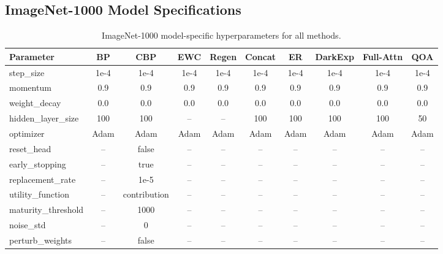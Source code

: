 \documentclass{article}
\begin{document}






\subsection{ImageNet-1000 Model Specifications}
\label{sec:imagenet_model_specs}

\begin{table}[t]
\centering
\caption{ImageNet-1000 model-specific hyperparameters for all methods.}
\label{tab:imagenet_model_specs}
\scriptsize
\setlength{\tabcolsep}{2pt}

\begin{tabular}{lccccccccc}
\toprule
\textbf{Parameter} & \textbf{BP} & \textbf{CBP} & \textbf{EWC} & \textbf{Regen} & \textbf{Concat} & \textbf{ER} & \textbf{DarkExp} & \textbf{Full-Attn} & \textbf{QOA} \\
\midrule
step\_size          & 1e-4 & 1e-4 & 1e-4 & 1e-4 & 1e-4 & 1e-4 & 1e-4 & 1e-4 & 1e-4 \\
momentum            & 0.9  & 0.9  & 0.9  & 0.9  & 0.9  & 0.9  & 0.9  & 0.9  & 0.9  \\
weight\_decay       & 0.0  & 0.0  & 0.0  & 0.0  & 0.0  & 0.0  & 0.0  & 0.0  & 0.0  \\
hidden\_layer\_size & 100  & 100  & --   & --   & 100  & 100  & 100  & 100  & 50   \\
optimizer           & Adam & Adam & Adam & Adam & Adam & Adam & Adam & Adam & Adam \\
\midrule
reset\_head         & --   & false & --  & --   & --   & --   & --   & --   & --   \\
early\_stopping     & --   & true  & --  & --   & --   & --   & --   & --   & --   \\
replacement\_rate   & --   & 1e-5  & --  & --   & --   & --   & --   & --   & --   \\
utility\_function   & --   & contribution & -- & -- & -- & -- & -- & -- & -- \\
maturity\_threshold & --   & 1000  & --  & --   & --   & --   & --   & --   & --   \\
noise\_std          & --   & 0     & --  & --   & --   & --   & --   & --   & --   \\
perturb\_weights    & --   & false & --  & --   & --   & --   & --   & --   & --   \\

\end{tabular}
\end{table}
\end{document}
